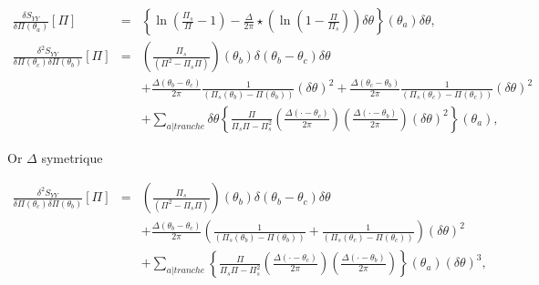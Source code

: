 	\begin{eqnarray}
		\frac{ \delta S_{YY} }{ \delta \Pi(\theta_a)  } [\Pi ]  & = &    \left \{ \ln \left ( \frac{ \Pi_s }{ \Pi  } - 1 \right )   -  \frac{ \Delta}{2\pi}  \star \left ( \ln \left ( 1 - \frac{ \Pi}{ \Pi_s }\right ) \right ) \delta \theta \right \} (\theta_a) \delta \theta , \\
		\frac{ \delta^2 S_{YY} }{ \delta \Pi(\theta_c) \delta \Pi(\theta_b)  } [\Pi ]  & = &   \left (  \frac{\Pi_s}{(\Pi^2  - \Pi_s\Pi)}    \right )(\theta_b) \delta( \theta_b - \theta_c)  \delta \theta  \\
		&  &  +   \frac{ \Delta ( \theta_b - \theta_c)}{ 2\pi}  \frac{1 }{(\Pi_s(\theta_b) -\Pi(\theta_b)) } (\delta \theta)^2 +  \frac{\Delta ( \theta_c - \theta_b )}{2\pi}\frac{1 }{( \Pi_s(\theta_c)  -   \Pi(\theta_c) ) }(\delta \theta)^2  \\
		& & + \sum_{a \vert tranche}   \delta \theta \left \{  \frac{\Pi }{\Pi_s\Pi - \Pi_s^2 }\left (  \frac{\Delta ( \cdot - \theta_c )}{2\pi} \right )\left (  \frac{\Delta ( \cdot - \theta_b )}{2\pi} \right )( \delta \theta)^2  \right \}(\theta_a) ,	 	
	\end{eqnarray}
	
	

		
	Or $\Delta$ symetrique 
		
	\begin{eqnarray}
		\frac{ \delta^2 S_{YY} }{ \delta \Pi(\theta_c) \delta \Pi(\theta_b)  } [\Pi ]  & = &   \left (  \frac{\Pi_s}{(\Pi^2  - \Pi_s\Pi)}    \right )(\theta_b) \delta( \theta_b - \theta_c)  \delta \theta  \\
		&  &  +   \frac{ \Delta ( \theta_b - \theta_c)}{ 2\pi} \left (  \frac{1 }{(\Pi_s(\theta_b) -\Pi(\theta_b)) }  +  \frac{1 }{( \Pi_s(\theta_c)  -   \Pi(\theta_c) ) } \right )(\delta \theta)^2  \\
		& & + \sum_{a \vert tranche}   \left \{  \frac{\Pi }{\Pi_s\Pi - \Pi_s^2 }\left (  \frac{\Delta ( \cdot - \theta_c )}{2\pi} \right )\left (  \frac{\Delta ( \cdot - \theta_b )}{2\pi} \right )  \right \}(\theta_a)( \delta \theta)^3 ,		
	\end{eqnarray}
